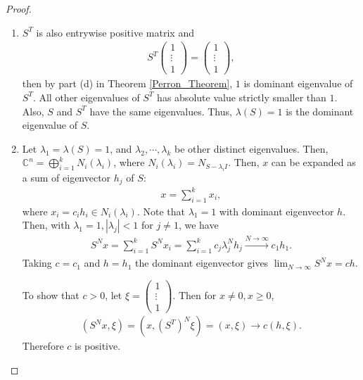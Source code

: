 \documentclass[11pt]{book}
\theoremstyle{definition}
\numberwithin{equation}{chapter}
\begin{document}
\begin{proof}
~\begin{enumerate}[label=(\alph*)]
    \item $S^T$ is also entrywise positive matrix and 
    \begin{align*}
        S^T \begin{pmatrix} 1 \\ \vdots \\ 1 \end{pmatrix} = \begin{pmatrix} 1 \\ \vdots \\ 1 \end{pmatrix},
    \end{align*}
    then by part (d) in Theorem \ref{Perron_Theorem}, $1$ is dominant eigenvalue of $S^T$. All other eigenvalues of $S^T$ has absolute value strictly smaller than $1$. Also, $S$ and $S^T$ have the same eigenvalues. Thus, $\lambda(S) = 1$ is the dominant eigenvalue of $S$.
    
    \item Let $\lambda_1 = \lambda(S) = 1$, and $\lambda_2, \cdots, \lambda_k$ be other distinct eigenvalues. Then, $\mathbb{C}^n = \bigoplus^k_{i=1} N_i(\lambda_i)$, where $N_i(\lambda_i) = N_{S - \lambda_i I}$. Then, $x$ can be expanded as a sum of eigenvector $h_j$ of $S$:
    \begin{align*}
        x = \sum^k_{i=1} x_i,
    \end{align*}
    where $x_i = c_i h_i \in N_i(\lambda_i)$. Note that $\lambda_1 = 1$ with dominant eigenvector $h$. Then, with $\lambda_1 = 1, |\lambda_j| < 1$ for $j \neq 1$, we have
    \begin{align*}
        S^N x = \sum^k_{i=1} S^N x_i = \sum^k_{i=1} c_j \lambda_j^N h_j \xrightarrow[]{N\to\infty} c_1 h_1.
    \end{align*}
    Taking $c = c_1$ and $h = h_1$ the dominant eigenvector gives $\lim_{N \to \infty} S^N x = ch$.
    
    To show that $c > 0$, let $\xi = \begin{pmatrix} 1 \\ \vdots \\ 1 \end{pmatrix}$. Then for $x \neq 0, x \geq 0$, 
    \begin{align*}
        \left(S^Nx, \xi\right) = \left(x, \left(S^T\right)^N \xi\right) = (x, \xi) \to c(h, \xi).
    \end{align*}
    Therefore $c$ is positive. 
\end{enumerate}
\end{proof}
\end{document}
